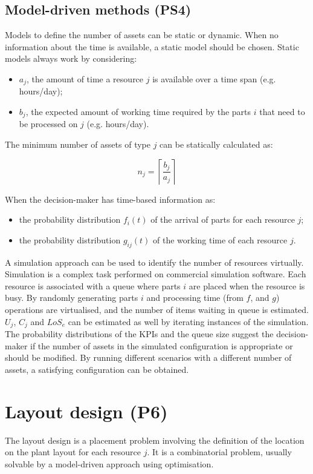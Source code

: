 \subsection{Model-driven methods (PS4)}
Models to define the number of assets can be static or dynamic. When no information about the time is available, a static model should be chosen. Static models always work by considering:
\begin{itemize}
    \item $a_j$, the amount of time a resource $j$ is available over a time span (e.g. hours/day);
	\item $b_j$, the expected amount of working time required by the parts $i$ that need to be processed on $j$ (e.g. hours/day).

\end{itemize}

The minimum number of assets of type $j$ can be statically calculated as:

\begin{equation}
    n_j=\left\lceil\frac{b_j}{a_j}\right\rceil
\end{equation}

When the decision-maker has time-based information as:
\begin{itemize}
    \item the probability distribution $f_i(t)$ of the arrival of parts for each resource $j$;
	\item the probability distribution $g_{ij}(t)$ of the working time of each resource $j$.

\end{itemize}

A simulation approach can be used to identify the number of resources virtually. Simulation is a complex task performed on commercial simulation software. Each resource is associated with a queue where parts $i$ are placed when the resource is busy. By randomly generating parts $i$ and processing time (from $f$, and $g$) operations are virtualised, and the number of items waiting in queue is estimated. $U_j$, $C_j$ and $LoS_e$ can be estimated as well by iterating instances of the simulation. The probability distributions of the KPIs and the queue size suggest the decision-maker if the number of assets in the simulated configuration is appropriate or should be modified. By running different scenarios with a different number of assets, a satisfying configuration can be obtained. 

\section{Layout design (P6)}
The layout design is a placement problem involving the definition of the location on the plant layout for each resource $j$. It is a combinatorial problem, usually solvable by a model-driven approach using optimisation.


